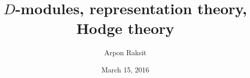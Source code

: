 

\title{$D$-modules, representation theory, Hodge theory}
\author{Arpon Raksit}
\date{March 15, 2016}


\newcommand{\an}{\mathrm{an}}
\newcommand{\dR}{\mathrm{dR}}
\newcommand{\Gr}{\operatorname{Gr}}
\newcommand{\hol}{\mathrm{hol}}
\newcommand{\QCoh}{\mathrm{QCoh}}
\newcommand{\Sch}{\mathrm{Sch}}
\newcommand{\sing}{\mathrm{sing}}
\newcommand{\sm}{\mathrm{sm}}



\maketitle
\thispagestyle{empty}



% 
\newpage

\addtocounter{section}{-1}


\newpage


\newpage


\newpage

%   


\nocite{*} 




